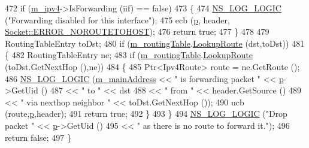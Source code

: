 \begin{DoxyCode}
472   \textcolor{keywordflow}{if} (\hyperlink{classns3_1_1dsdv_1_1RoutingProtocol_a955477c7f38e64762a264c24e3762af6}{m\_ipv4}->IsForwarding (iif) == \textcolor{keyword}{false})
473     \{
474       \hyperlink{group__logging_ga88acd260151caf2db9c0fc84997f45ce}{NS\_LOG\_LOGIC} (\textcolor{stringliteral}{"Forwarding disabled for this interface"});
475       ecb (\hyperlink{lte__link__budget_8m_ac9de518908a968428863f829398a4e62}{p}, header, \hyperlink{classns3_1_1Socket_ada1328c5ae0c28cb2a982caf8f6d6ccaa0f8ecb5a4ddbce3bade35fa12c3d49e8}{Socket::ERROR\_NOROUTETOHOST});
476       \textcolor{keywordflow}{return} \textcolor{keyword}{true};
477     \}
478 
479   RoutingTableEntry toDst;
480   \textcolor{keywordflow}{if} (\hyperlink{classns3_1_1dsdv_1_1RoutingProtocol_acc4cee466c2591e35f508ce58097a00e}{m\_routingTable}.\hyperlink{classns3_1_1dsdv_1_1RoutingTable_a0bfb9dc677f02bd740973865e38df763}{LookupRoute} (dst,toDst))
481     \{
482       RoutingTableEntry ne;
483       \textcolor{keywordflow}{if} (\hyperlink{classns3_1_1dsdv_1_1RoutingProtocol_acc4cee466c2591e35f508ce58097a00e}{m\_routingTable}.\hyperlink{classns3_1_1dsdv_1_1RoutingTable_a0bfb9dc677f02bd740973865e38df763}{LookupRoute} (toDst.GetNextHop (),ne))
484         \{
485           Ptr<Ipv4Route> route = ne.GetRoute ();
486           \hyperlink{group__logging_ga88acd260151caf2db9c0fc84997f45ce}{NS\_LOG\_LOGIC} (\hyperlink{classns3_1_1dsdv_1_1RoutingProtocol_af7cb076b88eb5ff20a1c146e3f5849f6}{m\_mainAddress} << \textcolor{stringliteral}{" is forwarding packet "} << 
      \hyperlink{lte__link__budget_8m_ac9de518908a968428863f829398a4e62}{p}->GetUid ()
487                                       << \textcolor{stringliteral}{" to "} << dst
488                                       << \textcolor{stringliteral}{" from "} << header.GetSource ()
489                                       << \textcolor{stringliteral}{" via nexthop neighbor "} << toDst.GetNextHop ());
490           ucb (route,\hyperlink{lte__link__budget_8m_ac9de518908a968428863f829398a4e62}{p},header);
491           \textcolor{keywordflow}{return} \textcolor{keyword}{true};
492         \}
493     \}
494   \hyperlink{group__logging_ga88acd260151caf2db9c0fc84997f45ce}{NS\_LOG\_LOGIC} (\textcolor{stringliteral}{"Drop packet "} << \hyperlink{lte__link__budget_8m_ac9de518908a968428863f829398a4e62}{p}->GetUid ()
495                                << \textcolor{stringliteral}{" as there is no route to forward it."});
496   \textcolor{keywordflow}{return} \textcolor{keyword}{false};
497 \}
\end{DoxyCode}


